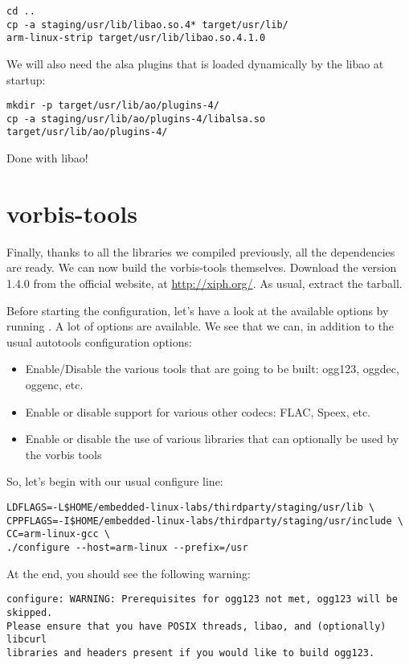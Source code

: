 \begin{verbatim}
cd ..
cp -a staging/usr/lib/libao.so.4* target/usr/lib/
arm-linux-strip target/usr/lib/libao.so.4.1.0
\end{verbatim}

We will also need the alsa plugins that is loaded dynamically by the
libao at startup:
\begin{verbatim}
mkdir -p target/usr/lib/ao/plugins-4/
cp -a staging/usr/lib/ao/plugins-4/libalsa.so target/usr/lib/ao/plugins-4/
\end{verbatim}

Done with libao!

\section{vorbis-tools}

Finally, thanks to all the libraries we compiled previously, all the
dependencies are ready. We can now build the vorbis-tools themselves.
Download the version 1.4.0 from the official website, at
\url{http://xiph.org/}. As usual, extract the tarball.

Before starting the configuration, let's have a look at the available
options by running . A lot of options are
available. We see that we can, in addition to the usual autotools
configuration options:

\begin{itemize}
\item Enable/Disable the various tools that are going to be built:
  ogg123, oggdec, oggenc, etc.
\item Enable or disable support for various other codecs: FLAC, Speex,
  etc.
\item Enable or disable the use of various libraries that can
  optionally be used by the vorbis tools
\end{itemize}

So, let's begin with our usual configure line:

\begin{verbatim}
LDFLAGS=-L$HOME/embedded-linux-labs/thirdparty/staging/usr/lib \
CPPFLAGS=-I$HOME/embedded-linux-labs/thirdparty/staging/usr/include \
CC=arm-linux-gcc \
./configure --host=arm-linux --prefix=/usr
\end{verbatim}

At the end, you should see the following warning:

\begin{verbatim}
configure: WARNING: Prerequisites for ogg123 not met, ogg123 will be skipped.
Please ensure that you have POSIX threads, libao, and (optionally) libcurl
libraries and headers present if you would like to build ogg123.
\end{verbatim}


